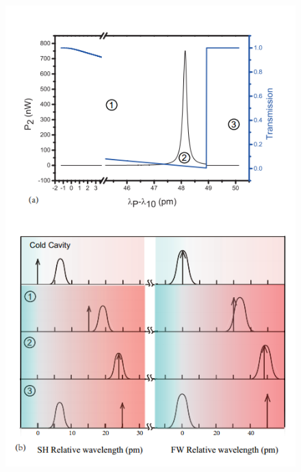 \documentclass[UTF8,a4paper,cs4size,hyperref]{ctexart}
\begin{document}
\begin{figure}
\centering
\includegraphics[width=13cm]{try_ed2}

\end{figure}
\end{document}
